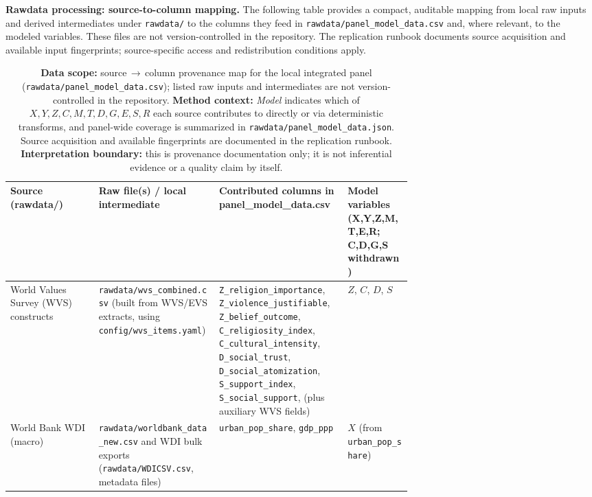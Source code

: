 \documentclass[11pt]{article}
\newcommand{\TableStyle}{%
    \small
    \setlength{\tabcolsep}{2pt}%
    \renewcommand{\arraystretch}{0.9}%
}
\begin{document}
\noindent\justifying
\textbf{Rawdata processing: source-to-column mapping.} The following table provides a compact, auditable mapping
from local raw inputs and derived intermediates under \nolinkurl{rawdata/} to the columns they feed in
\nolinkurl{rawdata/panel_model_data.csv} and, where relevant, to the modeled variables. These files are not
version-controlled in the repository. The replication runbook documents source acquisition and available input
fingerprints; source-specific access and redistribution conditions apply.

\begin{table}[!htbp]
\centering
\TableStyle
\caption{\textbf{Data scope:} source\,$\rightarrow$\,column provenance map for the local integrated panel (\nolinkurl{rawdata/panel_model_data.csv}); listed raw inputs and intermediates are not version-controlled in the repository. \textbf{Method context:} \textit{Model} indicates which of $X,Y,Z,C,M,T,D,G,E,S,R$ each source contributes to directly or via deterministic transforms, and panel-wide coverage is summarized in \nolinkurl{rawdata/panel_model_data.json}. Source acquisition and available fingerprints are documented in the replication runbook. \textbf{Interpretation boundary:} this is provenance documentation only; it is not inferential evidence or a quality claim by itself.}
\label{tab:source-column-map}
\scriptsize
\setlength{\tabcolsep}{3pt}
\renewcommand{\arraystretch}{1.1}
\begin{tabularx}{\linewidth}{@{}>{\raggedright\arraybackslash}p{0.22\linewidth} >{\raggedright\arraybackslash}p{0.30\linewidth} >{\raggedright\arraybackslash}X >{\raggedright\arraybackslash}p{0.16\linewidth}@{}}
\toprule
Source (rawdata/) & Raw file(s) / local intermediate & Contributed columns in panel\_model\_data.csv & Model variables (X,Y,Z,M,T,E,R; C,D,G,S withdrawn) \\
\midrule
World Values Survey (WVS) constructs & \nolinkurl{rawdata/wvs_combined.csv} (built from WVS/EVS extracts, using \nolinkurl{config/wvs_items.yaml}) & \texttt{Z\_religion\_importance}, \texttt{Z\_violence\_justifiable}, \texttt{Z\_belief\_outcome}, \texttt{C\_religiosity\_index}, \texttt{C\_cultural\_intensity}, \texttt{D\_social\_trust}, \texttt{D\_social\_atomization}, \texttt{S\_support\_index}, \texttt{S\_social\_support}, (plus auxiliary WVS fields) & $Z$, $C$, $D$, $S$ \\
World Bank WDI (macro) & \nolinkurl{rawdata/worldbank_data_new.csv} and WDI bulk exports (\nolinkurl{rawdata/WDICSV.csv}, metadata files) & \texttt{urban\_pop\_share}, \texttt{gdp\_ppp} & $X$ (from \texttt{urban\_pop\_share}) \\

\end{tabularx}
\end{table}
\end{document}

